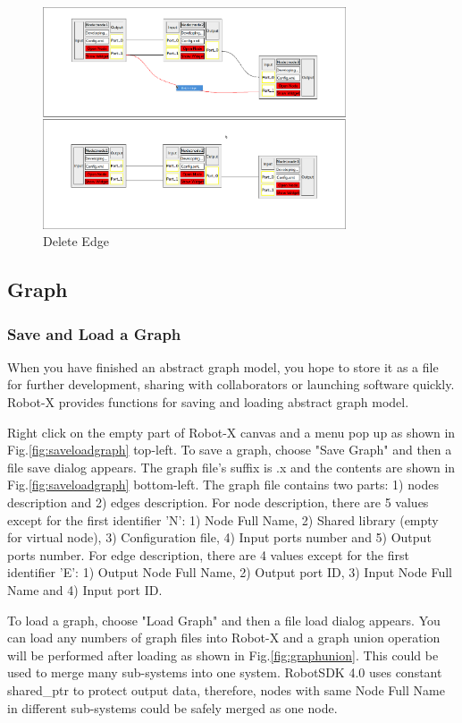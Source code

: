 \documentclass[a4paper,10pt]{book}
\begin{document}
\begin{figure}
 \centering
 \includegraphics[width=0.8\textwidth]{img/deleteedge.eps}
 \caption{Delete Edge}
 \label{fig:deleteedge}
\end{figure}

\subsection{Graph}

\subsubsection{Save and Load a Graph}

When you have finished an abstract graph model, you hope to store it as a file for further development, sharing with collaborators or launching software quickly. Robot-X provides functions for saving and loading abstract graph model. 

Right click on the empty part of Robot-X canvas and a menu pop up as shown in Fig.\ref{fig:saveloadgraph} top-left. To save a graph, choose "Save Graph" and then a file save dialog appears. The graph file's suffix is .x and the contents are shown in Fig.\ref{fig:saveloadgraph} bottom-left. The graph file contains two parts: 1) nodes description and 2) edges description. For node description, there are 5 values except for the first identifier 'N': 1) Node Full Name, 2) Shared library (empty for virtual node), 3) Configuration file, 4) Input ports number and 5) Output ports number. For edge description, there are 4 values except for the first identifier 'E': 1) Output Node Full Name, 2) Output port ID, 3) Input Node Full Name and 4) Input port ID.

To load a graph, choose "Load Graph" and then a file load dialog appears. You can load any numbers of graph files into Robot-X and a graph union operation will be performed after loading as shown in Fig.\ref{fig:graphunion}. This could be used to merge many sub-systems into one system. RobotSDK 4.0 uses constant shared\_ptr to protect output data, therefore, nodes with same Node Full Name in different sub-systems could be safely merged as one node. 
\end{document}
